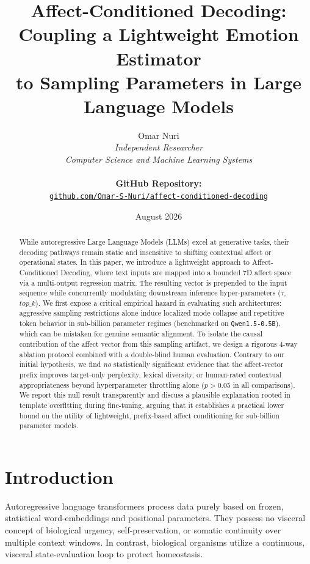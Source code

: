 \documentclass[10pt,twocolumn]{article}
\title{\textbf{Affect-Conditioned Decoding:\\
Coupling a Lightweight Emotion Estimator\\
to Sampling Parameters in Large Language Models}}
\author{
  Omar Nuri\\
  \textit{Independent Researcher}\\
  \textit{Computer Science and Machine Learning Systems}\\
  \textit{ }\\
  \textbf{GitHub Repository:} \\
  \href{https://github.com/Omar-S-Nuri/affect-conditioned-decoding}
  {\texttt{github.com/Omar-S-Nuri/affect-conditioned-decoding}}
}
\date{August 2026}
\begin{document}
\maketitle

\begin{abstract}
While autoregressive Large Language Models (LLMs) excel at generative tasks, their decoding pathways remain static and insensitive to shifting contextual affect or operational states. In this paper, we introduce a lightweight approach to Affect-Conditioned Decoding, where text inputs are mapped into a bounded 7D affect space via a multi-output regression matrix. The resulting vector is prepended to the input sequence while concurrently modulating downstream inference hyper-parameters ($\tau$, $top\_k$). We first expose a critical empirical hazard in evaluating such architectures: aggressive sampling restrictions alone induce localized mode collapse and repetitive token behavior in sub-billion parameter regimes (benchmarked on \texttt{Qwen1.5-0.5B}), which can be mistaken for genuine semantic alignment. To isolate the causal contribution of the affect vector from this sampling artifact, we design a rigorous 4-way ablation protocol combined with a double-blind human evaluation. Contrary to our initial hypothesis, we find \emph{no} statistically significant evidence that the affect-vector prefix improves target-only perplexity, lexical diversity, or human-rated contextual appropriateness beyond hyperparameter throttling alone ($p > 0.05$ in all comparisons). We report this null result transparently and discuss a plausible explanation rooted in template overfitting during fine-tuning, arguing that it establishes a practical lower bound on the utility of lightweight, prefix-based affect conditioning for sub-billion parameter models.
\end{abstract}


\section{Introduction}
Autoregressive language transformers process data purely based on frozen, statistical word-embeddings and positional parameters. They possess no visceral concept of biological urgency, self-preservation, or somatic continuity over multiple context windows. In contrast, biological organisms utilize a continuous, visceral state-evaluation loop to protect homeostasis.
\end{document}
